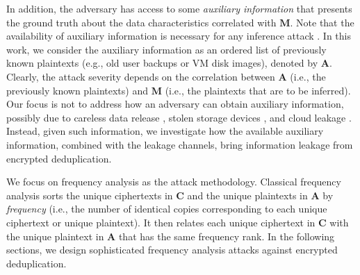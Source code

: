 \documentclass[bachelor]{thesis-uestc}
\begin{document}

In addition, the adversary has access to some {\em auxiliary information} that
presents the ground truth about the data characteristics correlated with
$\mathbf{M}$. Note that the availability of auxiliary information is necessary
for any inference attack \cite{kumar07,li17,grubbs17,zhang16b,kellaris16,ritzdorf16,naveed15,cash15,islam12}.
In this work, we consider the auxiliary information as an ordered list of
previously known plaintexts (e.g., old user backups or VM disk images),
denoted by $\mathbf{A}$.  Clearly, the attack severity depends on the
correlation between $\mathbf{A}$ (i.e., the previously known plaintexts) and
$\mathbf{M}$ (i.e., the plaintexts that are to be inferred).  Our focus is not
to address how an adversary can obtain auxiliary information, possibly due to
careless data release \cite{careless-release}, stolen storage devices
\cite{stolen-device}, and cloud leakage \cite{cloud-leakage}. Instead, given
such information, we investigate how the available auxiliary information,
combined with the leakage channels, bring information leakage from encrypted
deduplication. 

We focus on frequency analysis \cite{alkadit92} as the attack methodology.
Classical frequency analysis sorts the unique ciphertexts in $\mathbf{C}$ and
the unique plaintexts in $\mathbf{A}$ by {\em frequency} (i.e., the number of
identical copies corresponding to each unique ciphertext or unique plaintext). 
It then relates each unique ciphertext in $\mathbf{C}$ with the unique
plaintext in $\mathbf{A}$ that has the same frequency rank. In the following
sections, we design sophisticated frequency analysis attacks against encrypted
deduplication. 
\end{document}
